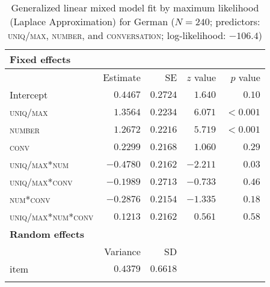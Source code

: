 \documentclass[output=paper]{langscibook}
\begin{document}
\begin{table}
    \begin{tabular}{lrrrr}
    \lsptoprule
\textbf{Fixed effects}&\\\midrule
&            Estimate & SE & $z$ value & $p$ value\\  
Intercept               &$0.4467$   &$0.2724$ &$1.640$  &$0.10$\\
\textsc{uniq/max}       &$1.3564$  &$0.2234$ &$6.071$ &$<0.001$\\
\textsc{number}         &$1.2672$   &$0.2216$   &$5.719$    &$<0.001$\\
\textsc{conv}           &$0.2299$  &$0.2168$ &$1.060$ &$0.29$\\
\textsc{uniq/max*num}   &$-0.4780$  &$0.2162$   &$-2.211$   &$0.03$\\
\textsc{uniq/max*conv}  &$-0.1989$  &$0.2713$ &$-0.733$ &$0.46$\\
\textsc{num*conv}       &$-0.2876$  &$0.2154$   &$-1.335$   &$0.18$\\
\textsc{uniq/max*num*conv}  &$0.1213$   &$0.2162$   &$0.561$    &$0.58$\medskip\\
\textbf{Random effects}&\\\midrule
& Variance &SD\\
item&$0.4379$&$0.6618$\\
\lspbottomrule
    \end{tabular}
    \caption{Generalized linear mixed model fit by maximum likelihood (Laplace Approximation) for German ($N=240$; predictors: \textsc{uniq/max}, \textsc{number}, and \textsc{conversation}; log-likelihood: $-106.4$)}
    \label{sim-dem:tab:stats3ge}
\end{table}

\end{document}
